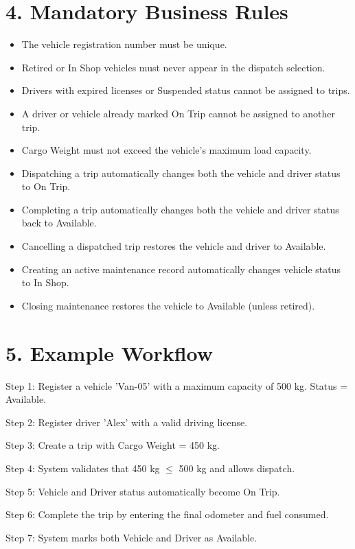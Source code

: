 \documentclass{article}
\begin{document}
\section*{4. Mandatory Business Rules}

\begin{itemize}
    \item The vehicle registration number must be unique.
    \item Retired or In Shop vehicles must never appear in the dispatch selection.
    \item Drivers with expired licenses or Suspended status cannot be assigned to trips.
    \item A driver or vehicle already marked On Trip cannot be assigned to another trip.
    \item Cargo Weight must not exceed the vehicle's maximum load capacity.
    \item Dispatching a trip automatically changes both the vehicle and driver status to On Trip.
    \item Completing a trip automatically changes both the vehicle and driver status back to Available.
    \item Cancelling a dispatched trip restores the vehicle and driver to Available.
    \item Creating an active maintenance record automatically changes vehicle status to In Shop.
    \item Closing maintenance restores the vehicle to Available (unless retired).
\end{itemize}

\section*{5. Example Workflow}

Step 1: Register a vehicle 'Van-05' with a maximum capacity of 500 kg. Status = Available.

Step 2: Register driver 'Alex' with a valid driving license.

Step 3: Create a trip with Cargo Weight = 450 kg.

Step 4: System validates that 450 kg $\leq$ 500 kg and allows dispatch.

Step 5: Vehicle and Driver status automatically become On Trip.

Step 6: Complete the trip by entering the final odometer and fuel consumed.

Step 7: System marks both Vehicle and Driver as Available.
\end{document}
